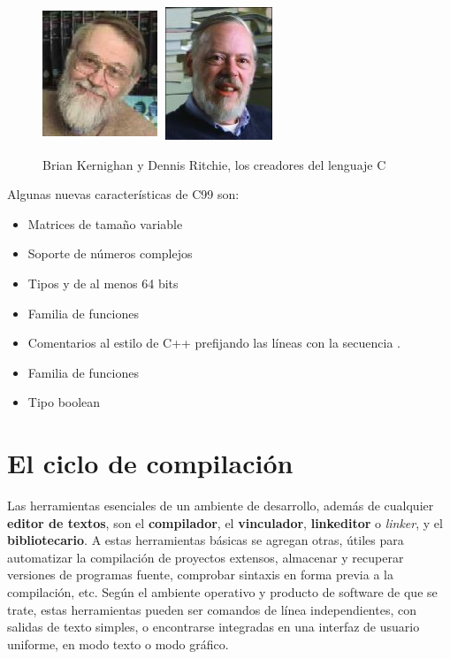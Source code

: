  \begin{figure}[htbp] 
 \centering 
 \includegraphics[width=3.44cm,height=3.969cm]{./img/kernighan.jpg} 
 \includegraphics[width=3.44cm,height=3.969cm]{./img/dennis_ritchie.jpg} 
 \caption{Brian Kernighan y Dennis Ritchie, los creadores del lenguaje C} 
 \label{fig:kandr} 
 \end{figure} 


Algunas nuevas características de C99 son: 

\begin{itemize}
\item Matrices de tamaño variable 
\item Soporte de números complejos 
\item Tipos  y  de al menos 64 bits 
\item Familia de funciones  
\item Comentarios al estilo de C++ prefijando las líneas con la secuencia \code{//}. 
\item Familia de funciones  
\item Tipo boolean
\end{itemize}


\section{El ciclo de compilación}
Las herramientas esenciales de un ambiente de desarrollo, además de
cualquier \textbf{editor de textos}, son el \textbf{compilador}, el \textbf{vinculador}, 
\textbf{linkeditor} o \textit{linker}, y el \textbf{bibliotecario}. A
estas herramientas básicas se agregan otras, útiles para
automatizar la compilación de proyectos extensos, almacenar y
recuperar versiones de programas fuente, comprobar sintaxis en forma
previa a la compilación, etc. Según el ambiente operativo y
producto de software de que se trate, estas herramientas pueden ser comandos de línea independientes, con
salidas de texto simples, o encontrarse integradas en una interfaz de usuario uniforme, en modo
texto o modo gráfico. 

